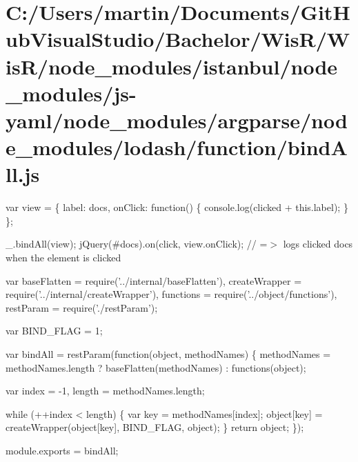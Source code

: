 \hypertarget{_c_1_2_users_2martin_2_documents_2_git_hub_visual_studio_2_bachelor_2_wis_r_2_wis_r_2node_modulea35e634a791715917f13ee9c8f82053c}{}\section{C\+:/\+Users/martin/\+Documents/\+Git\+Hub\+Visual\+Studio/\+Bachelor/\+Wis\+R/\+Wis\+R/node\+\_\+modules/istanbul/node\+\_\+modules/js-\/yaml/node\+\_\+modules/argparse/node\+\_\+modules/lodash/function/bind\+All.\+js}
var view = \{ \textquotesingle{}label\textquotesingle{}\+: \textquotesingle{}docs\textquotesingle{}, \textquotesingle{}on\+Click\textquotesingle{}\+: function() \{ console.\+log(\textquotesingle{}clicked \textquotesingle{} + this.\+label); \} \};

\+\_\+.\+bind\+All(view); j\+Query(\textquotesingle{}\#docs\textquotesingle{}).on(\textquotesingle{}click\textquotesingle{}, view.\+on\+Click); // =$>$ logs \textquotesingle{}clicked docs\textquotesingle{} when the element is clicked


\begin{DoxyCodeInclude}
var baseFlatten = require(\textcolor{stringliteral}{'../internal/baseFlatten'}),
    createWrapper = require(\textcolor{stringliteral}{'../internal/createWrapper'}),
    functions = require(\textcolor{stringliteral}{'../object/functions'}),
    restParam = require(\textcolor{stringliteral}{'./restParam'});

var BIND\_FLAG = 1;

var bindAll = restParam(\textcolor{keyword}{function}(\textcolor{keywordtype}{object}, methodNames) \{
  methodNames = methodNames.length ? baseFlatten(methodNames) : functions(object);

  var index = -1,
      length = methodNames.length;

  \textcolor{keywordflow}{while} (++index < length) \{
    var key = methodNames[index];
    \textcolor{keywordtype}{object}[key] = createWrapper(\textcolor{keywordtype}{object}[key], BIND\_FLAG, \textcolor{keywordtype}{object});
  \}
  \textcolor{keywordflow}{return} object;
\});

module.exports = bindAll;
\end{DoxyCodeInclude}
 